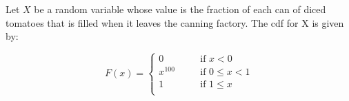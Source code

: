 


\renewcommand\assignment{Worksheet 14, Due February 20, 4:15pm}


    \iffalse
    \begin{equation*}
        \begin{gathered}
            Equations go here.
        \end{gathered}
    \end{equation*}

    \resizebox{\hsize}{!}{$Long equation goes here$}

    \begin{multicol*}{# of columns}
    \end{multicol*}

    \horizontal

    \fi


    Let $X$ be a random variable whose value is the fraction of each can of diced tomatoes that is filled when it leaves the canning factory. The cdf for X is given by:
    
    \begin{equation*}
        F(x) = 
        \left\{
            \begin{array}{lll}
                0       & \quad  & \text{if } x < 0             \\
                x^{100} & \quad  & \text{if } 0 \leq x  < 1     \\
                1       & \quad  & \text{if } 1 \leq  x         \\
            \end{array}
        \right.
    \end{equation*}

